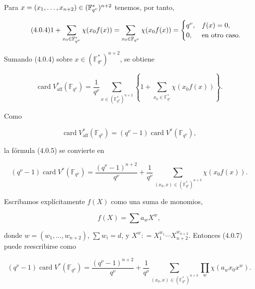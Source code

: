 Para $\sisi{\chi=(\chi_1,\ldots,\chi_{n+2})}{x=(x_1,\ldots,x_{n+2})}\in(\mathbb F_{q^\nu}^*)^{n+2}$ tenemos,
por tanto,

\pageoriginale

\begin{equation}\tag{4.0.4}
1+\sum_{\sisi{X_0}{x_0}\in\mathbb F_{q^\nu}^*}\chi(x_0f(x))
=\sum_{x_0\in\mathbb F_{q^\nu}}\chi(x_0f(x))
=
\begin{cases}
q^\nu,&f(x)=0,\\
0,&\text{en otro caso}.
\end{cases}
\end{equation}

Sumando (4.0.4) sobre $x\in(\mathbb F_{q^\nu}^*)^{n+2}$, se obtiene

\begin{equation}\tag{4.0.5}
\operatorname{card}V^*_{\mathrm{aff}}(\mathbb F_{q^\nu})
=\frac1{q^\nu}
\sum_{x\in(\mathbb F_{q^\nu}^*)^{n+2}}
\left\{1+\sum_{x_0\in\mathbb F_{q^\nu}^*}\chi(x_0f(x))\right\}.
\end{equation}

Como

\begin{equation}\tag{4.0.6}
\operatorname{card}V^*_{\mathrm{aff}}(\mathbb F_{q^\nu})
=(q^\nu-1)\operatorname{card}V^*(\mathbb F_{q^\nu}),
\end{equation}

la fórmula (4.0.5) se convierte en

\begin{equation}\tag{4.0.7}
(q^\nu-1)\operatorname{card}V^*(\mathbb F_{q^\nu})
=\frac{(q^\nu-1)^{n+2}}{q^\nu}
+\frac1{q^\nu}
\sum_{(x_0,x)\in(\mathbb F_{q^\nu}^*)^{n+3}}\chi(x_0f(x)).
\end{equation}

Escribamos explícitamente $f(X)$ como una suma de monomios,

\begin{equation}\tag{4.0.8}
f(X)=\sum a_wX^w,
\end{equation}

donde $w=(w_1,\ldots,w_{n+2})$, $\sum w_i=d$, y
$X^w\mathrel{\mathop:}=X_1^{w_1}\cdots X_{n+2}^{w_{n+2}}$. Entonces
(4.0.7) puede reescribirse como

\begin{equation}\tag{4.0.9}
(q^\nu-1)\operatorname{card}V^*(\mathbb F_{q^\nu})
=\frac{(q^\nu-1)^{n+2}}{q^\nu}
+\frac1{q^\nu}
\sum_{(x_0,x)\in(\mathbb F_{q^\nu}^*)^{n+3}}
\prod_w\chi(a_wx_0x^w).
\end{equation}

